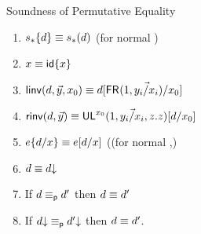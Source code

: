 \begin{conjecture}{Soundness of Permutative Equality} \label{thm:permutative-soundess}
\begin{enumerate}
\item $s_*\{d\} \equiv s_*(d)$ (for normal \D)
\item $x \equiv {\ensuremath{\mathsf{id}}\{x\}}$
\item $\mathsf{linv}(d,\vec{y},x_0) \equiv d[\mathsf{FR}_{}(1,\vec{y_i/x_i})/x_0]$
\item $\mathsf{rinv}(d,\vec{y}) \equiv \mathsf{UL}^{x_0}_{}(1,\vec{y_i/x_i},z.z)[d/x_0]$
\item $e\{d/x\} \equiv e[d/x]$ ((for normal \D,\E)
\item $d \equiv d\mathord{\downarrow}$
\item If $d \equiv_{\mathsf{p}} d'$ then $d \equiv d'$
\item If $d\mathord{\downarrow} \equiv_{\mathsf{p}} d'\mathord{\downarrow}$ then $d \equiv d'$.  
\end{enumerate}
\end{conjecture}
